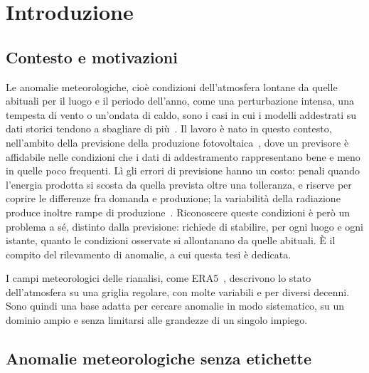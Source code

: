 \chapter{Introduzione}
\label{chap:introduzione}

\section{Contesto e motivazioni}

Le anomalie meteorologiche, cioè condizioni dell'atmosfera lontane da quelle abituali per il luogo e il periodo dell'anno, come una perturbazione intensa, una tempesta di vento o un'ondata di caldo, sono i casi in cui i modelli addestrati su dati storici tendono a sbagliare di più~\cite{rasp2020weatherbench}. Il lavoro è nato in questo contesto, nell'ambito della previsione della produzione fotovoltaica~\cite{antonanzas2016review}, dove un previsore è affidabile nelle condizioni che i dati di addestramento rappresentano bene e meno in quelle poco frequenti. Lì gli errori di previsione hanno un costo: penali quando l'energia prodotta si scosta da quella prevista oltre una tolleranza, e riserve per coprire le differenze fra domanda e produzione; la variabilità della radiazione produce inoltre rampe di produzione~\cite{antonanzas2016review}.
Riconoscere queste condizioni è però un problema a sé, distinto dalla previsione: richiede di stabilire, per ogni luogo e ogni istante, quanto le condizioni osservate si allontanano da quelle abituali. È il compito del rilevamento di anomalie, a cui questa tesi è dedicata.

I campi meteorologici delle rianalisi, come ERA5~\cite{hersbach2020era5}, descrivono lo stato dell'atmosfera su una griglia regolare, con molte variabili e per diversi decenni. Sono quindi una base adatta per cercare anomalie in modo sistematico, su un dominio ampio e senza limitarsi alle grandezze di un singolo impiego.

\section{Anomalie meteorologiche senza etichette}

